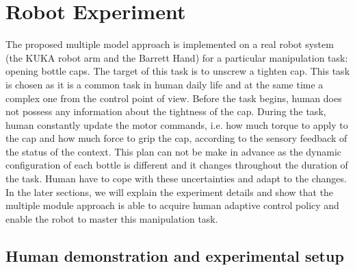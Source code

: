 \section{Robot Experiment}
\label{sec:exp}
The proposed multiple model approach is implemented on a real robot system (the KUKA robot arm and the Barrett Hand) for a particular manipulation task: opening bottle caps. The target of this task is to unscrew a tighten cap. 
This task is chosen as it is a common task in human daily life and at the same time a complex one from the control point of view. 
Before the task begins, human does not possess any information about the tightness of the cap. During the task, human constantly update the motor commands, i.e. how much torque to apply to the cap and how much force to grip the cap, according to the sensory feedback of the status of the context. This plan can not be make in advance as the dynamic configuration of each bottle is different and it changes throughout the duration of the task. Human have to cope with these uncertainties and adapt to the changes. In the later sections, we will explain the experiment details and show that the multiple module approach is able to acquire human adaptive control policy and enable the robot to master this manipulation task.

\subsection{Human demonstration and experimental setup}
\label{sec:exp_demo}


